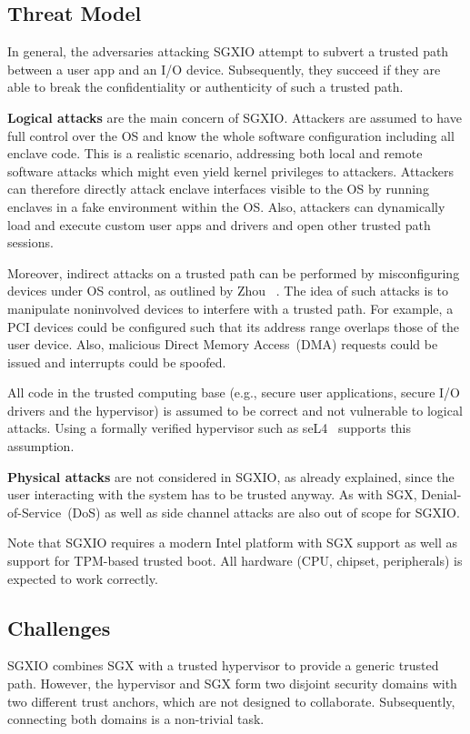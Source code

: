 \documentclass{sig-alternate-05-2015}
\begin{document}
\subsection{Threat Model}\label{sec:threat_models}
In general, the adversaries attacking SGXIO attempt to subvert a trusted path between a user app and an I/O device. 
Subsequently, they succeed if they are able to break the confidentiality or authenticity of such a trusted path.

\textbf{Logical attacks} are the main concern of SGXIO. 
Attackers are assumed to have full control over the OS and know the whole software configuration including all enclave code. 
This is a realistic scenario, addressing both local and remote software attacks which might even yield kernel privileges to attackers. 
Attackers can therefore directly attack enclave interfaces visible to the OS by running enclaves in a fake environment within the OS. 
Also, attackers can dynamically load and execute custom user apps and drivers and open other trusted path sessions.

Moreover, indirect attacks on a trusted path can be performed by misconfiguring devices under OS control, as outlined by Zhou \etal~\cite{zhou_building_2012}. 
The idea of such attacks is to manipulate noninvolved devices to interfere with a trusted path. 
For example, a PCI devices could be configured such that its address range overlaps those of the user device. 
Also, malicious Direct Memory Access~(DMA) requests could be issued and interrupts could be spoofed.

All code in the trusted computing base (e.g., secure user applications, secure I/O drivers and the hypervisor) is assumed to be correct and not vulnerable to logical attacks. 
Using a formally verified hypervisor such as seL4~\cite{sel4proof} supports this assumption.

\textbf{Physical attacks} are not considered in SGXIO, as already explained, since the user interacting with the system has to be trusted anyway.
As with SGX, Denial-of-Service~(DoS) as well as side channel attacks are also out of scope for SGXIO.

Note that SGXIO requires a modern Intel platform with SGX support as well as support for TPM-based trusted boot. 
All hardware (CPU, chipset, peripherals) is expected to work correctly.

\subsection{Challenges}
SGXIO combines SGX with a trusted hypervisor to provide a generic trusted path. 
However, the hypervisor and SGX form two disjoint security domains with two different trust anchors, which are not designed to collaborate. 
Subsequently, connecting both domains is a non-trivial task. 
\end{document}
